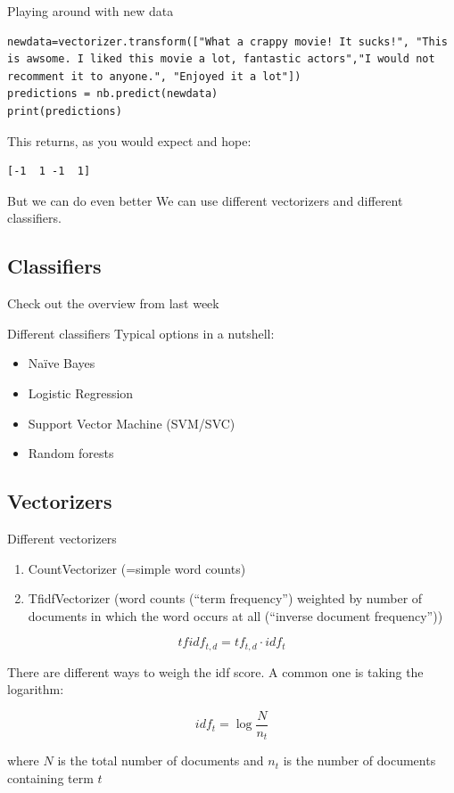 \documentclass[compress]{beamer}
\begin{document}
\begin{frame}[fragile]{Playing around with new data}
\begin{lstlisting}
newdata=vectorizer.transform(["What a crappy movie! It sucks!", "This is awsome. I liked this movie a lot, fantastic actors","I would not recomment it to anyone.", "Enjoyed it a lot"])
predictions = nb.predict(newdata)
print(predictions)
\end{lstlisting}
This returns, as you would expect and hope:
\begin{lstlisting} 
[-1  1 -1  1]
\end{lstlisting}


\end{frame}




\begin{frame}{But we can do even better}
We can use different vectorizers and different classifiers.
\end{frame}


\subsection{Classifiers}

\begin{frame}[standout]
Check out the overview from last week
\end{frame}

\begin{frame}{Different classifiers}
	Typical options in a nutshell:
\begin{itemize}
	\item Na\"ive Bayes
	\item Logistic Regression
	\item Support Vector Machine (SVM/SVC)
	\item Random forests
\end{itemize}
\end{frame}


\subsection{Vectorizers}

\begin{frame}{Different vectorizers}
\begin{enumerate}[<+->]
	\item CountVectorizer (=simple word counts)
	\item TfidfVectorizer (word counts (``term frequency'') weighted by number of documents in which the word occurs at all (``inverse document frequency''))
\end{enumerate}

\pause
$$tfidf_{t,d} = tf_{t,d} \cdot idf_{t}$$

There are different ways to weigh the idf score. A common one is taking the logarithm:

$$idf_{t} = \log \frac{N}{n_t}$$

where $N$ is the total number of documents and $n_t$ is the number of documents containing term $t$
\end{frame}
\end{document}
